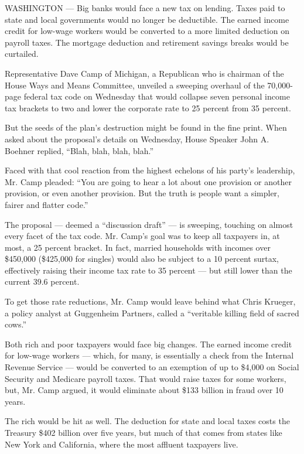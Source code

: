 WASHINGTON --- Big banks would face a new tax on lending. Taxes paid to
state and local governments would no longer be deductible. The earned
income credit for low-wage workers would be converted to a more limited
deduction on payroll taxes. The mortgage deduction and retirement
savings breaks would be curtailed.

Representative Dave Camp of Michigan, a Republican who is chairman of
the House Ways and Means Committee, unveiled a sweeping overhaul of the
70,000-page federal tax code on Wednesday that would collapse seven
personal income tax brackets to two and lower the corporate rate to 25
percent from 35 percent.

But the seeds of the plan's destruction might be found in the fine
print. When asked about the proposal's details on Wednesday, House
Speaker John A. Boehner replied, ``Blah, blah, blah, blah.''

Faced with that cool reaction from the highest echelons of his party's
leadership, Mr. Camp pleaded: ``You are going to hear a lot about one
provision or another provision, or even another provision. But the truth
is people want a simpler, fairer and flatter code.''

The proposal --- deemed a ``discussion draft'' --- is sweeping, touching
on almost every facet of the tax code. Mr. Camp's goal was to keep all
taxpayers in, at most, a 25 percent bracket. In fact, married households
with incomes over \$450,000 (\$425,000 for singles) would also be
subject to a 10 percent surtax, effectively raising their income tax
rate to 35 percent --- but still lower than the current 39.6 percent.

To get those rate reductions, Mr. Camp would leave behind what Chris
Krueger, a policy analyst at Guggenheim Partners, called a ``veritable
killing field of sacred cows.''

Both rich and poor taxpayers would face big changes. The earned income
credit for low-wage workers --- which, for many, is essentially a check
from the Internal Revenue Service --- would be converted to an exemption
of up to \$4,000 on Social Security and Medicare payroll taxes. That
would raise taxes for some workers, but, Mr. Camp argued, it would
eliminate about \$133 billion in fraud over 10 years.

The rich would be hit as well. The deduction for state and local taxes
costs the Treasury \$402 billion over five years, but much of that comes
from states like New York and California, where the most affluent
taxpayers live.


